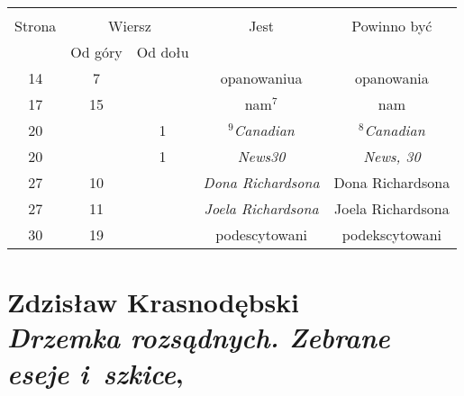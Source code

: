 \documentclass[a4paper,11pt]{article}
\numberwithin{equation}{section}
\begin{document}
\begin{center}

  \begin{tabular}{|c|c|c|c|c|}
    \hline
    & \multicolumn{2}{c|}{} & & \\
    Strona & \multicolumn{2}{c|}{Wiersz} & Jest
                              & Powinno być \\ \cline{2-3}
    & Od góry & Od dołu & & \\
    \hline
    14  &  7 & & opanowaniua & opanowania \\
    17  & 15 & & nam$^{ 7 }$ & nam \\
    20  & &  1 & $^{ 9 }$\textit{Canadian} & $^{ 8 }$\textit{Canadian} \\
    20  & &  1 & \textit{News30} & \textit{News, 30} \\
    27  & 10 & & \textit{Dona Richardsona} & Dona Richardsona \\
    27  & 11 & & \textit{Joela Richardsona} & Joela Richardsona \\
    30  & 19 & & podescytowani & podekscytowani \\
    \hline
  \end{tabular}

\end{center}

\VerSpaceTwo











\section{ %
  Zdzisław Krasnodębski \\
  \textit{Drzemka rozsądnych. Zebrane eseje i~szkice},
  \cite{KrasnodebskiDrzemkaRozsadnych2006}}


\end{document}
